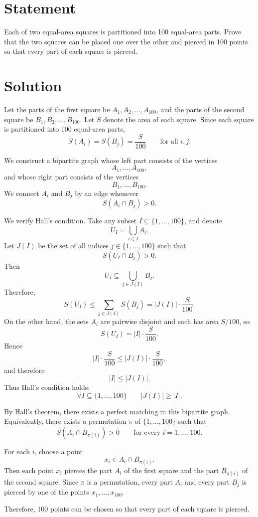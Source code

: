 \documentclass[12pt]{article}
\begin{document}
\section*{Statement}

Each of two equal-area squares is partitioned into 100 equal-area parts. Prove that the two squares can be placed one over the other and pierced in 100 points so that every part of each square is pierced.

\section*{Solution}

Let the parts of the first square be \(A_1, A_2, \dots, A_{100}\), and the parts of the second square be \(B_1, B_2, \dots, B_{100}\). Let \(S\) denote the area of each square. Since each square is partitioned into 100 equal-area parts,
\[
S(A_i)=S(B_j)=\frac{S}{100}
\qquad
\text{for all } i,j.
\]

We construct a bipartite graph whose left part consists of the vertices
\[
A_1,\dots,A_{100},
\]
and whose right part consists of the vertices
\[
B_1,\dots,B_{100}.
\]
We connect \(A_i\) and \(B_j\) by an edge whenever
\[
S(A_i\cap B_j)>0.
\]

We verify Hall's condition. Take any subset \(I\subseteq \{1,\dots,100\}\), and denote
\[
U_I=\bigcup_{i\in I} A_i.
\]
Let \(J(I)\) be the set of all indices \(j\in \{1,\dots,100\}\) such that
\[
S(U_I\cap B_j)>0.
\]
Then
\[
U_I\subseteq \bigcup_{j\in J(I)} B_j.
\]
Therefore,
\[
S(U_I)\le \sum_{j\in J(I)} S(B_j)=|J(I)|\cdot \frac{S}{100}.
\]
On the other hand, the sets \(A_i\) are pairwise disjoint and each has area \(S/100\), so
\[
S(U_I)=|I|\cdot \frac{S}{100}.
\]
Hence
\[
|I|\cdot \frac{S}{100}\le |J(I)|\cdot \frac{S}{100},
\]
and therefore
\[
|I|\le |J(I)|.
\]
Thus Hall's condition holds:
\[
\forall I\subseteq \{1,\dots,100\}\qquad |J(I)|\ge |I|.
\]

By Hall's theorem, there exists a perfect matching in this bipartite graph. Equivalently, there exists a permutation \(\pi\) of \(\{1,\dots,100\}\) such that
\[
S(A_i\cap B_{\pi(i)})>0
\qquad
\text{for every } i=1,\dots,100.
\]

For each \(i\), choose a point
\[
x_i\in A_i\cap B_{\pi(i)}.
\]
Then each point \(x_i\) pierces the part \(A_i\) of the first square and the part \(B_{\pi(i)}\) of the second square. Since \(\pi\) is a permutation, every part \(A_i\) and every part \(B_j\) is pierced by one of the points \(x_1,\dots,x_{100}\).

Therefore, 100 points can be chosen so that every part of each square is pierced.
\end{document}
